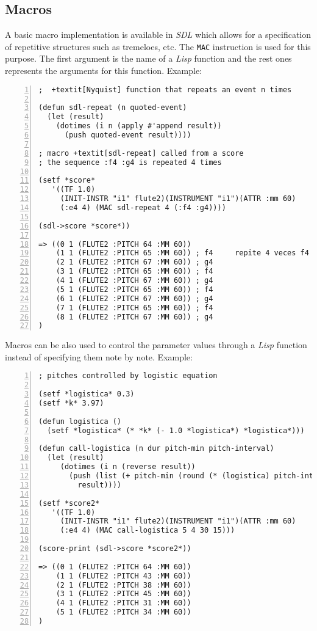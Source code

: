 \subsection{Macros}
A basic macro implementation is available in \textit{SDL} which allows for a specification of repetitive structures such as tremeloes, etc. The \texttt{MAC} instruction is used for this purpose. The first argument is the name of a \textit{Lisp} function and the rest ones represents the arguments for this function. Example:
\begin{Verbatim}[frame=single,fontsize=\small,numbers=left,numbersep=2mm,
                 commandchars=+\[\]]
;  +textit[Nyquist] function that repeats an event n times 

(defun sdl-repeat (n quoted-event)
  (let (result)
    (dotimes (i n (apply #'append result))
      (push quoted-event result))))

; macro +textit[sdl-repeat] called from a score
; the sequence :f4 :g4 is repeated 4 times

(setf *score*
   '((TF 1.0)
     (INIT-INSTR "i1" flute2)(INSTRUMENT "i1")(ATTR :mm 60)
     (:e4 4) (MAC sdl-repeat 4 (:f4 :g4))))

(sdl->score *score*))

=> ((0 1 (FLUTE2 :PITCH 64 :MM 60))
    (1 1 (FLUTE2 :PITCH 65 :MM 60)) ; f4     repite 4 veces f4 g4
    (2 1 (FLUTE2 :PITCH 67 :MM 60)) ; g4
    (3 1 (FLUTE2 :PITCH 65 :MM 60)) ; f4 
    (4 1 (FLUTE2 :PITCH 67 :MM 60)) ; g4
    (5 1 (FLUTE2 :PITCH 65 :MM 60)) ; f4
    (6 1 (FLUTE2 :PITCH 67 :MM 60)) ; g4
    (7 1 (FLUTE2 :PITCH 65 :MM 60)) ; f4
    (8 1 (FLUTE2 :PITCH 67 :MM 60)) ; g4
)
\end{Verbatim}
Macros can be also used to control the parameter values through a \textit{Lisp} function instead of specifying them note by note. Example:
\begin{Verbatim}[frame=single,fontsize=\small,numbers=left,numbersep=2mm,
                 commandchars=+\[\]]
; pitches controlled by logistic equation

(setf *logistica* 0.3)
(setf *k* 3.97)

(defun logistica ()
  (setf *logistica* (* *k* (- 1.0 *logistica*) *logistica*)))

(defun call-logistica (n dur pitch-min pitch-interval)
  (let (result)
     (dotimes (i n (reverse result))
       (push (list (+ pitch-min (round (* (logistica) pitch-interval))) dur)
	     result))))

(setf *score2*
   '((TF 1.0)
     (INIT-INSTR "i1" flute2)(INSTRUMENT "i1")(ATTR :mm 60)
     (:e4 4) (MAC call-logistica 5 4 30 15)))

(score-print (sdl->score *score2*))

=> ((0 1 (FLUTE2 :PITCH 64 :MM 60))
    (1 1 (FLUTE2 :PITCH 43 :MM 60))
    (2 1 (FLUTE2 :PITCH 38 :MM 60))
    (3 1 (FLUTE2 :PITCH 45 :MM 60))
    (4 1 (FLUTE2 :PITCH 31 :MM 60))
    (5 1 (FLUTE2 :PITCH 34 :MM 60))
)
\end{Verbatim}

